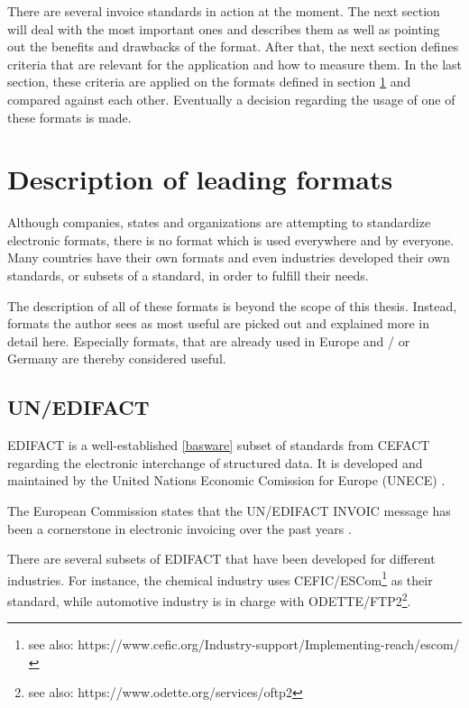 \documentclass[english,mt]{lmedoc}
\begin{document}
There are several invoice standards in action at the moment. The next section will deal with the most important ones and describes them as well as pointing out the benefits and drawbacks of the format.
After that, the next section defines criteria that are relevant for the application and how to measure them.
In the last section, these criteria are applied on the formats defined in section \ref{sec2.1} and compared against each other. Eventually a decision regarding the usage of one of these formats is made.

\section{Description of leading formats}
\label{sec2.1}

Although companies, states and organizations are attempting to standardize electronic formats, there is no format which is used everywhere and by everyone. Many countries have their own formats and even industries developed their own standards, or subsets of a standard, in order to fulfill their needs.

The description of all of these formats is beyond the scope of this thesis. Instead, formats the author sees as most useful are picked out and explained more in detail here. Especially formats, that are already used in Europe and / or Germany are thereby considered useful.

\subsection{UN/EDIFACT}
\label{sec2.1.1}

EDIFACT is a well-established \ref{basware} subset of standards from CEFACT regarding the electronic interchange of structured data. It is developed and maintained by the United Nations Economic Comission for Europe (UNECE) \cite{unece}.

The European Commission states that the UN/EDIFACT INVOIC message has been a cornerstone in electronic invoicing over the past years \cite{ECInvcStandardization, page 14}.

There are several subsets of EDIFACT that have been developed for different industries. For instance, the chemical industry uses CEFIC/ESCom\footnote{see also: https://www.cefic.org/Industry-support/Implementing-reach/escom/} as their standard, while automotive industry is in charge with ODETTE/FTP2\footnote{see also: https://www.odette.org/services/oftp2}.
\end{document}
